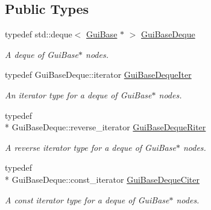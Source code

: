 \subsection*{Public Types}
\begin{DoxyCompactItemize}
\item 
\hypertarget{class_gui_base_a0f3e57c1a942210072030196844b22eb}{typedef std\-::deque$<$ \hyperlink{class_gui_base}{Gui\-Base} $\ast$ $>$ \hyperlink{class_gui_base_a0f3e57c1a942210072030196844b22eb}{Gui\-Base\-Deque}}\label{class_gui_base_a0f3e57c1a942210072030196844b22eb}

\begin{DoxyCompactList}\small\item\em A deque of Gui\-Base$\ast$ nodes. \end{DoxyCompactList}\item 
\hypertarget{class_gui_base_a38bc5568225f8923caf32f75716cc354}{typedef Gui\-Base\-Deque\-::iterator \hyperlink{class_gui_base_a38bc5568225f8923caf32f75716cc354}{Gui\-Base\-Deque\-Iter}}\label{class_gui_base_a38bc5568225f8923caf32f75716cc354}

\begin{DoxyCompactList}\small\item\em An iterator type for a deque of Gui\-Base$\ast$ nodes. \end{DoxyCompactList}\item 
\hypertarget{class_gui_base_ae7e0e9c9c8fe03ac1760b8bb74c46786}{typedef \\*
Gui\-Base\-Deque\-::reverse\-\_\-iterator \hyperlink{class_gui_base_ae7e0e9c9c8fe03ac1760b8bb74c46786}{Gui\-Base\-Deque\-Riter}}\label{class_gui_base_ae7e0e9c9c8fe03ac1760b8bb74c46786}

\begin{DoxyCompactList}\small\item\em A reverse iterator type for a deque of Gui\-Base$\ast$ nodes. \end{DoxyCompactList}\item 
\hypertarget{class_gui_base_a40106bc7f71c718672756d0668aa83eb}{typedef \\*
Gui\-Base\-Deque\-::const\-\_\-iterator \hyperlink{class_gui_base_a40106bc7f71c718672756d0668aa83eb}{Gui\-Base\-Deque\-Citer}}\label{class_gui_base_a40106bc7f71c718672756d0668aa83eb}

\begin{DoxyCompactList}\small\item\em A const iterator type for a deque of Gui\-Base$\ast$ nodes. \end{DoxyCompactList}\end{DoxyCompactItemize}

